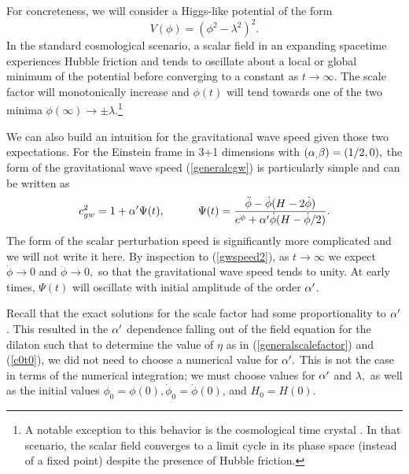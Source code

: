 \documentclass[amsmath,amssymb,11pt]{article}
\begin{document}
For concreteness, we will consider a Higgs-like potential of the form
\begin{equation}\label{Vhiggs}
V(\phi) = (\phi^2-\lambda^2)^2.
\end{equation}
In the standard cosmological scenario, a scalar field in an expanding spacetime experiences Hubble friction and tends to oscillate about a local or global minimum of the potential before converging to a constant as $t\rightarrow\infty.$ 
 The scale factor will monotonically increase and $\phi(t)$ will tend towards one of the two minima $\phi(\infty)\rightarrow\pm\lambda$.\footnote{A notable exception to this behavior is the cosmological time crystal \cite{Bains:2015gpv,Easson:2016klq,Easson:2018qgr}. In that scenario, the scalar field converges to a limit cycle in its phase space (instead of a fixed point) despite the presence of Hubble friction. }
 
We can also build an intuition for the gravitational wave speed given those two expectations. For the Einstein frame in 3+1 dimensions with $(\alpha_,\beta)=(1/2,0),$ the form of the gravitational wave speed (\ref{generalcgw}) is particularly simple and can be written as
\begin{equation}\label{gwspeed2}
c_{gw}^2=1+\alpha'\Psi(t), \ \ \ \ \ \ \ \ \ \Psi(t) = \frac{\ddot{\phi}-\dot{\phi}(H-2\dot{\phi})}{e^\phi+\alpha'\dot{\phi}(H-\dot{\phi}/2)}.
\end{equation}
The form of the scalar perturbation speed is significantly more complicated and we will not write it here.  By inspection to (\ref{gwspeed2}), as $t\rightarrow\infty$ we expect $\dot{\phi}\rightarrow 0$ and $\ddot{\phi}\rightarrow 0,$ so that the gravitational wave speed tends to unity. At early times, $\Psi(t)$ will oscillate with initial amplitude of the order $\alpha'$. 

Recall that the exact solutions for the scale factor had some proportionality to $\alpha'$. This resulted in the $\alpha'$ dependence falling out of the field equation for the dilaton such that to determine the value of $\eta$ as in (\ref{generalscalefactor}) and (\ref{c0t0}), we did not need to choose a numerical value for $\alpha'.$ This is not the case in terms of the numerical integration; we must choose values for $\alpha'$ and $\lambda,$ as well as the initial values $\phi_0=\phi(0),\dot{\phi}_0=\dot{\phi}(0)$, and $H_0=H(0)$.
\end{document}
